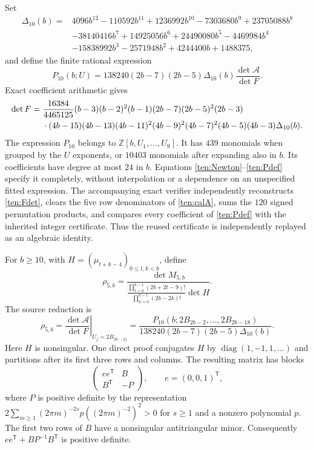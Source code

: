 Set
\begin{align*}
 \Delta_{10}(b)={}&4096b^{12}-110592b^{11}+1236992b^{10}
 -7303680b^9+23705088b^8\\
 &-38140416b^7+14925056b^6+24490080b^5-4469984b^4\\
 &-15838992b^3-2571948b^2+4244400b+1488375,
\end{align*}
and define the finite rational expression
\begin{equation}\label{ten:Pdef}
 P_{10}(b;U)=138240(2b-7)(2b-5)\Delta_{10}(b)
                       \frac{\det\mathcal A}{\det F}.
\end{equation}
Exact coefficient arithmetic gives
\begin{align}\label{ten:Fdet}
 \det F={}&\frac{16384}{4465125}(b-3)(b-2)^2(b-1)
     (2b-7)(2b-5)^2(2b-3)\notag\\
 &\cdot(4b-15)(4b-13)(4b-11)^2(4b-9)^2(4b-7)^2
          (4b-5)(4b-3)\Delta_{10}(b).
\end{align}
The expression $P_{10}$ belongs to $\mathbb Z[b,U_1,\ldots,U_9]$.
It has $439$ monomials when grouped by the $U$ exponents, or
$10403$ monomials after expanding also in $b$.  Its coefficients
have degree at most $24$ in $b$.  Equations
\eqref{ten:Newton}--\eqref{ten:Pdef} specify it completely, without
interpolation or a dependence on an unspecified fitted expression.
The accompanying exact verifier independently reconstructs
\eqref{ten:Fdet}, clears the five row denominators of
\eqref{ten:calA}, sums the $120$ signed permutation products, and
compares every coefficient of \eqref{ten:Pdef} with the inherited
integer certificate.  Thus the reused certificate is independently
replayed as an algebraic identity.

For $b\ge10$, with $H=(\mu_{t+k-4})_{0\le t,k<b}$, define
\[
 \rho_{5,b}=\frac{\det M_{5,b}}
 {\displaystyle
  \frac{\prod_{t=0}^{b-1}(2b+2t-9)!}
       {\prod_{k=0}^{b-1}(2b-2k)!}\det H}.
\]
The source reduction is
\begin{equation}\label{ten:rho}
 \rho_{5,b}
 =\left.\frac{\det\mathcal A}{\det F}\right|_{U_j=2B_{2b-2j}}
 =\frac{P_{10}(b;2B_{2b-2},\ldots,2B_{2b-18})}
 {138240(2b-7)(2b-5)\Delta_{10}(b)}.
\end{equation}
Here $H$ is nonsingular.  One direct proof conjugates $H$ by
$\operatorname{diag}(1,-1,1,\ldots)$ and partitions after its first
three rows and columns.  The resulting matrix has blocks
\[
 \begin{pmatrix}ee^{\mathsf T}&B\\B^{\mathsf T}&-P\end{pmatrix},
 \qquad e=(0,0,1)^{\mathsf T},
\]
where $P$ is positive definite by the representation
$2\sum_{m\ge1}(2\pi m)^{-2s}p((2\pi m)^{-2})^2>0$ for
$s\ge1$ and a nonzero polynomial $p$.  The first two rows of $B$
have a nonsingular antitriangular minor.  Consequently
$ee^{\mathsf T}+BP^{-1}B^{\mathsf T}$ is positive definite.

